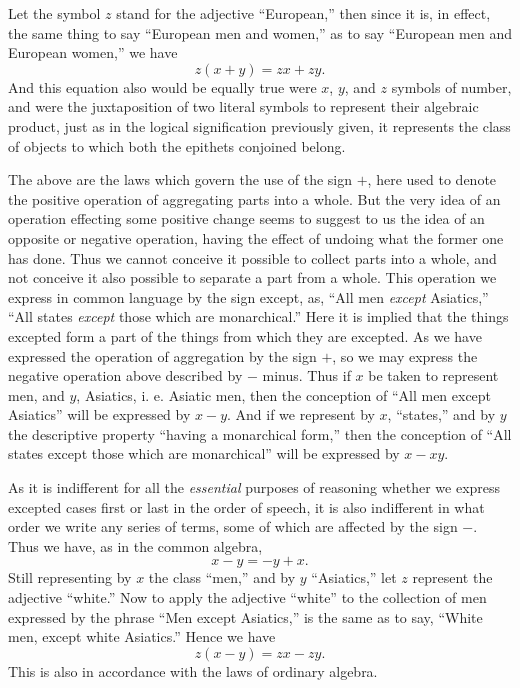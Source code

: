 \documentclass[oneside]{book}
\begin{document}
Let the symbol $z$ stand for the adjective ``European,'' then
since it is, in effect, the same thing to say ``European men and
women,'' as to say ``European men and European women,'' we
have
\begin{equation}
z\left(x + y\right) = zx + zy.
\end{equation}
And this equation also would be equally true were $x$, $y$, and $z$
symbols of number, and were the juxtaposition of two literal
symbols to represent their algebraic product, just as in the logical
signification previously given, it represents the class of objects to
which both the epithets conjoined belong.

The above are the laws which govern the use of the sign
$+$, here used to denote the positive operation of aggregating
parts into a whole. But the very idea of an operation effecting
some positive change seems to suggest to us the idea of an opposite
or negative operation, having the effect of undoing what the
former one has done. Thus we cannot conceive it possible to
collect parts into a whole, and not conceive it also possible to
separate a part from a whole. This operation we express in
common language by the sign except, as, ``All men \textit{except}
Asiatics,'' ``All states \textit{except} those which are monarchical.''
Here it is implied that the things excepted form a part of the
things from which they are excepted. As we have expressed
the operation of aggregation by the sign $+$, so we may express
the negative operation above described by $-$ minus. Thus if $x$
be taken to represent men, and $y$, Asiatics, i. e. Asiatic men,
then the conception of ``All men except Asiatics'' will be expressed
by $x - y$. And if we represent by $x$, ``states,'' and by
$y$ the descriptive property ``having a monarchical form,'' then
the conception of ``All states except those which are monarchical''
will be expressed by $x - xy$.

As it is indifferent for all the \textit{essential} purposes of reasoning
whether we express excepted cases first or last in the order of
speech, it is also indifferent in what order we write any series of
terms, some of which are affected by the sign $-$. Thus we have,
as in the common algebra,
\begin{equation}
x-y = -y + x.
\end{equation}
Still representing by $x$ the class ``men,'' and by $y$ ``Asiatics,''
let $z$ represent the adjective ``white.'' Now to apply the adjective
``white'' to the collection of men expressed by the phrase
``Men except Asiatics,'' is the same as to say, ``White men,
except white Asiatics.'' Hence we have
\begin{equation}
z\left(x-y\right) = zx-zy.
\end{equation}
This is also in accordance with the laws of ordinary algebra.
\end{document}
